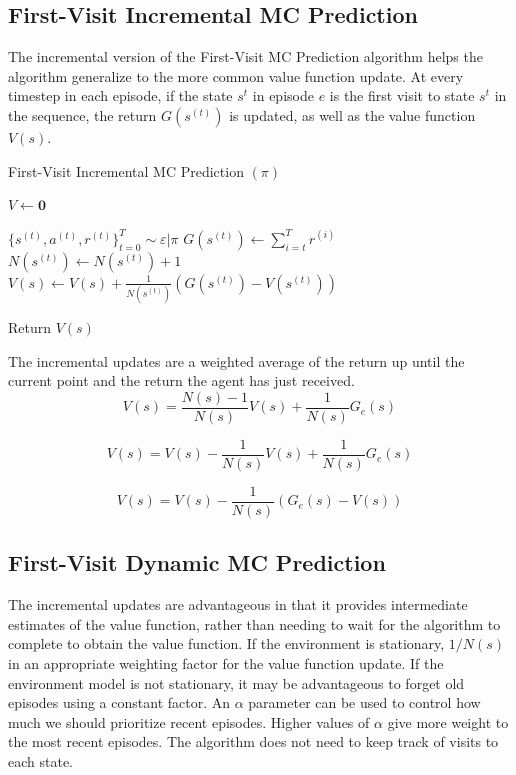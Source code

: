 \documentclass[11pt]{article}
\begin{document}
\subsection{First-Visit Incremental MC Prediction}
The incremental version of the First-Visit MC Prediction algorithm helps the algorithm generalize to the more common value function update. At every timestep in each episode, if the state $s^t$ in episode $e$ is the first visit to state $s^t$ in the sequence, the return $G(s^{(t)})$ is updated, as well as the value function $V(s)$. 

\begin{algorithm}[H]
\caption{First-Visit Incremental MC Prediction $(\pi)$}
\label{algo:FVIMC}
\begin{algorithmic}[1]
\STATE $V \leftarrow \mathbf{0}$ \hfill
{}

\STATE $\{s^{(t)}, a^{(t)}, r^{(t)}\}_{t=0}^T \sim \varepsilon|\pi$ \hfill 
{}
\STATE $G(s^{(t)}) \leftarrow \sum_{i=t}^T r^{(i)}$ \hfill 
\STATE $N(s^{(t)}) \leftarrow N(s^{(t)})  + 1$ \hfill 
\STATE $V(s) \leftarrow V(s) + \frac{1}{N(s^{(t)})}(G(s^{(t)})-V(s^{(t)}))$  \hfill
\ENDIF

\ENDFOR
\ENDFOR
\STATE Return $V(s)$  \hfill
\end{algorithmic}
\end{algorithm}

The incremental updates are a weighted average of the return up until the current point and the return the agent has just received. 
\begin{equation}
    V(s) = \frac{N(s)-1}{N(s)} V(s) + \frac{1}{N(s)}G_e(s)
\end{equation}

\begin{equation}
    V(s) = V(s) - \frac{1}{N(s)} V(s) + \frac{1}{N(s)}G_e(s)
\end{equation}

\begin{equation}
    V(s) = V(s) - \frac{1}{N(s)} (G_e(s)-V(s))
\end{equation}

\subsection{First-Visit Dynamic MC Prediction}
The incremental updates are advantageous in that it provides intermediate estimates of the value function, rather than needing to wait for the algorithm to complete to obtain the value function. If the environment is stationary, $1/N(s)$ in an appropriate weighting factor for the value function update. If the environment model is not stationary, it may be advantageous to forget old episodes using a constant factor. An $\alpha$ parameter can be used to control how much we should prioritize recent episodes. Higher values of $\alpha$ give more weight to the most recent episodes. The algorithm does not need to keep track of visits to each state.
\end{document}
